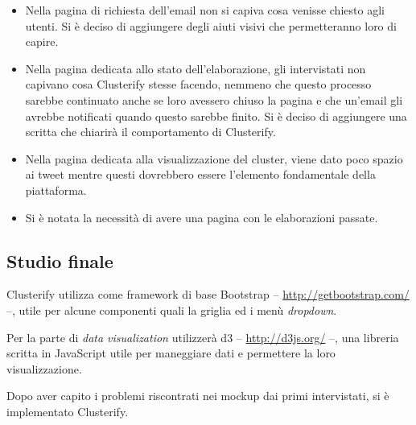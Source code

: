 	\begin{itemize}
		\item  Nella pagina di richiesta dell'email non si capiva cosa venisse chiesto agli utenti. Si è deciso di aggiungere degli aiuti visivi che permetteranno loro di capire.
            
            	\item Nella pagina dedicata allo stato dell'elaborazione, gli intervistati non capivano cosa Clusterify stesse facendo, nemmeno che questo processo sarebbe continuato anche se loro avessero chiuso la pagina e che un'email gli avrebbe notificati quando questo sarebbe finito. Si è deciso di aggiungere una scritta che chiarirà il comportamento di Clusterify. 
                        
            	\item Nella pagina dedicata alla visualizzazione del cluster, viene dato poco spazio ai tweet mentre questi dovrebbero essere l'elemento fondamentale della piattaforma.
            
            	\item Si è notata la necessità di avere una pagina con le elaborazioni passate.
            \end{itemize}
            

\subsection{Studio finale}        
	Clusterify utilizza come framework di base Bootstrap -- \url{http://getbootstrap.com/} --, utile per alcune componenti quali la griglia ed i menù \emph{dropdown}.
        
	Per la parte di \emph{data visualization} utilizzerà d3 -- \url{http://d3js.org/} --, una libreria scritta in JavaScript utile per maneggiare dati e permettere la loro visualizzazione.
        
	Dopo aver capito i problemi riscontrati nei mockup dai primi intervistati, si è implementato Clusterify.

